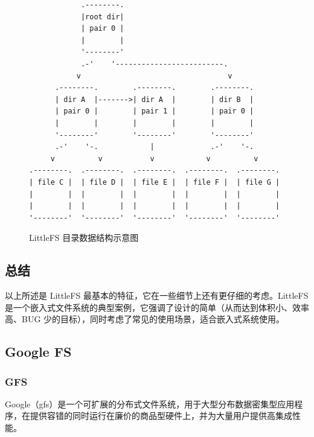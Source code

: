 \documentclass{ctexart}
\begin{document}
\begin{figure}
\begin{verbatim}
            .--------.
            |root dir|
            | pair 0 |
            |        |
            '--------'
            .-'    '-------------------------.
           v                                  v
      .--------.        .--------.        .--------.
      | dir A  |------->| dir A  |        | dir B  |
      | pair 0 |        | pair 1 |        | pair 0 |
      |        |        |        |        |        |
      '--------'        '--------'        '--------'
      .-'    '-.            |             .-'    '-.
     v          v           v            v          v
.--------.  .--------.  .--------.  .--------.  .--------.
| file C |  | file D |  | file E |  | file F |  | file G |
|        |  |        |  |        |  |        |  |        |
|        |  |        |  |        |  |        |  |        |
'--------'  '--------'  '--------'  '--------'  '--------'
\end{verbatim}
\caption{LittleFS 目录数据结构示意图}
\end{figure}

\subsection{总结}

以上所述是 LittleFS 最基本的特征，它在一些细节上还有更仔细的考虑。LittleFS 是一个嵌入式文件系统的典型案例，它强调了设计的简单（从而达到体积小、效率高、BUG 少的目标），同时考虑了常见的使用场景，适合嵌入式系统使用。

\subsection{Google FS}
\subsubsection{GFS}
Google（gfs）是一个可扩展的分布式文件系统，用于大型分布数据密集型应用程序，在提供容错的同时运行在廉价的商品型硬件上，并为大量用户提供高集成性能。\cite{GFS}
\end{document}

